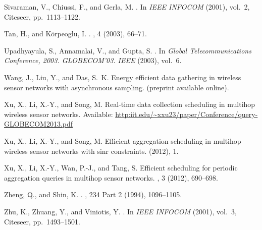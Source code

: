 \documentclass[conference,10pt]{IEEEtran}\usepackage{amsmath}
\begin{document}
\begin{thebibliography}{10}
{\sc Sivaraman, V., Chiussi, F., and Gerla, M.}
.
\newblock In {\em IEEE INFOCOM\/} (2001), vol.~2, Citeseer, pp.~1113--1122.

{\sc Tan, H., and K{\"o}rpeoglu, I.}
.
, 4 (2003), 66--71.

{\sc Upadhyayula, S., Annamalai, V., and Gupta, S.}
.
\newblock In {\em Global Telecommunications Conference, 2003. GLOBECOM'03.
  IEEE\/} (2003), vol.~6.

{\sc Wang, J., Liu, Y., and Das, S.~K.}
\newblock Energy efficient data gathering in wireless sensor networks with
  asynchronous sampling.
 (preprint available
  online).

{\sc Xu, X., Li, X.-Y., and Song, M.}
\newblock Real-time data collection scheduling in multihop wireless sensor
  networks.
Available: \url{http:iit.edu/~xxu23/paper/Conference/query-GLOBECOM2013.pdf}

{\sc Xu, X., Li, X.-Y., and Song, M.}
\newblock Efficient aggregation scheduling in multihop wireless sensor networks
  with sinr constraints.
 (2012), 1.

{\sc Xu, X., Li, X.-Y., Wan, P.-J., and Tang, S.}
\newblock Efficient scheduling for periodic aggregation queries in multihop
  sensor networks.
, 3 (2012),
  690--698.

{\sc Zheng, Q., and Shin, K.}
.
, 234 Part 2 (1994),
  1096--1105.

{\sc Zhu, K., Zhuang, Y., and Viniotis, Y.}
.
\newblock In {\em IEEE INFOCOM\/} (2001), vol.~3, Citeseer, pp.~1493--1501.

\end{thebibliography}
\end{document}
